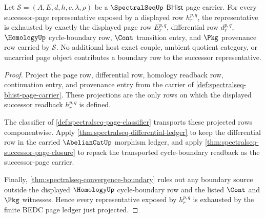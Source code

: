 \begin{theorem}
\label{thm:spectralseq-page-boundary-exhaustion}
Let $\mathcal S=(A,E,d,h,c,\lambda,\rho)$ be a $\SpectralSeqUp$
$\mathsf{BHist}$ page carrier. For every successor-page representative exposed
by a displayed row $h_r^{p,q}$, the representative is exhausted by exactly the
displayed page row $E_r^{p,q}$, differential row $d_r^{p,q}$,
$\HomologyUp$ cycle-boundary row, $\Cont$ transition entry, and $\Pkg$
provenance row carried by $\mathcal S$. No additional host exact couple,
ambient quotient category, or uncarried page object contributes a boundary row
to the successor representative.
\end{theorem}
\begin{proof}
Project the page row, differential row, homology readback row, continuation
entry, and provenance entry from the carrier of
\autoref{def:spectralseq-bhist-page-carrier}. These projections are the only
rows on which the displayed successor readback $h_r^{p,q}$ is defined.

The classifier of \autoref{def:spectralseq-page-classifier} transports these
projected rows componentwise. Apply
\autoref{thm:spectralseq-differential-ledger} to keep the differential row in
the carried $\AbelianCatUp$ morphism ledger, and apply
\autoref{thm:spectralseq-successor-page-closure} to repack the transported
cycle-boundary readback as the successor-page carrier.

Finally, \autoref{thm:spectralseq-convergence-boundary} rules out any boundary
source outside the displayed $\HomologyUp$ cycle-boundary row and the listed
$\Cont$ and $\Pkg$ witnesses. Hence every representative exposed by
$h_r^{p,q}$ is exhausted by the finite BEDC page ledger just projected.
\end{proof}

